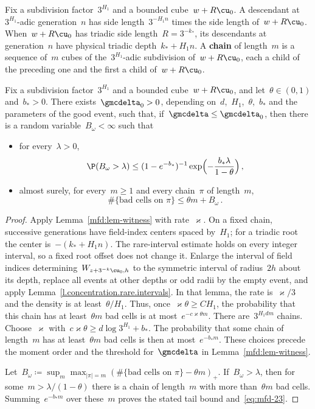 \documentclass[11pt]{amsart}
\begin{document}
Fix a subdivision factor~$3^{H_1}$ and a bounded cube~$w+R\cu_0$. A descendant at~$3^{H_1}$-adic generation~$n$ has side length~$3^{-H_1n}$ times the side length of~$w+R\cu_0$. When~$w+R\cu_0$ has triadic side length~$R=3^{-k_*}$, its descendants at generation~$n$ have physical triadic depth~$k_*+H_1n$. A \textbf{chain} of length~$m$ is a sequence of~$m$ cubes of the~$3^{H_1}$-adic subdivision of~$w+R\cu_0$, each a child of the preceding one and the first a child of~$w+R\cu_0$.

\begin{proposition}
\label{mfd:prop-allchain}
Fix a subdivision factor~$3^{H_1}$ and a bounded cube~$w+R\cu_0$, and let~$\theta\in(0,1)$ and~$b_*>0$. There exists~$\gmcdelta_0>0$, depending on~$d$,~$H_1$,~$\theta$,~$b_*$ and the parameters of the good event, such that, if~$\gmcdelta\leq\gmcdelta_0$, then there is a random variable~$B_\omega<\infty$ such that
\begin{itemize}
\item for every~$\lambda>0$,
\begin{equation*}
	\P(B_\omega>\lambda)\leq(1-e^{-b_*})^{-1}\exp\Bigl(-\frac{b_*\lambda}{1-\theta}\Bigr)\,,
\end{equation*}
\item almost surely, for every~$m\geq1$ and every chain~$\pi$ of length~$m$,
\begin{equation}
	\#\{\text{bad cells on }\pi\}\leq\theta m+B_\omega\,.
	\label{eq:mfd-23}
\end{equation}
\end{itemize}
\end{proposition}

\begin{proof}
Apply Lemma~\ref{mfd:lem-witness} with rate~$\varkappa$. On a fixed chain, successive generations have field-index centers spaced by~$H_1$; for a triadic root the center is~$-(k_*+H_1n)$. The rare-interval estimate holds on every integer interval, so a fixed root offset does not change it. Enlarge the interval of field indices determining~$W_{z+3^{-k}\cu_0,h}$ to the symmetric interval of radius~$2h$ about its depth, replace all events at other depths or odd radii by the empty event, and apply Lemma~\ref{l.concentration.rare.intervals}. In that lemma, the rate is~$\varkappa/3$ and the density is at least~$\theta/H_1$. Thus, once~$\varkappa\theta\geq CH_1$, the probability that this chain has at least~$\theta m$ bad cells is at most~$e^{-c\varkappa\theta m}$. There are~$3^{H_1dm}$ chains. Choose~$\varkappa$ with~$c\varkappa\theta\geq d\log3^{H_1}+b_*$. The probability that some chain of length~$m$ has at least~$\theta m$ bad cells is then at most~$e^{-b_*m}$. These choices precede the moment order and the threshold for~$\gmcdelta$ in Lemma~\ref{mfd:lem-witness}.

\smallskip

Let~$B_\omega\coloneqq\sup_m\max_{|\pi|=m}(\#\{\text{bad cells on }\pi\}-\theta m)_+$. If~$B_\omega>\lambda$, then for some~$m>\lambda/(1-\theta)$ there is a chain of length~$m$ with more than~$\theta m$ bad cells. Summing~$e^{-b_*m}$ over these~$m$ proves the stated tail bound and~\eqref{eq:mfd-23}.
\end{proof}
\end{document}
